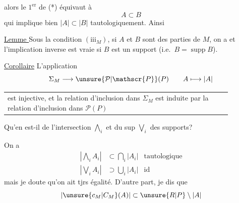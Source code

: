 
alors le $1^{\mathrm{er}}$  de (*)  équivaut à
\[
A\subset B
\]
qui implique bien $|A|\subset|B|$ tautologiquement. Ainsi

\uline{Lemme } Sous la  condition $(\mathrm{iii}_M)$, si $A$ et $B$ sont des parties de $M$, on a
et l'implication inverse est vraie si $B$ est un support (i.e.\ $B=\operatorname{supp}B$).

\uline{Corollaire} L'application
\[
\Sigma_M\longrightarrow\unsure{\mathcal{P}|\mathscr{P}}(P)\qquad A\longmapsto|A|
\]
\begin{tabular}{|p{0.88\linewidth}}
est injective, et la relation d'inclusion dans $\Sigma_M$ est induite par la relation d'inclusion dans $\mathcal{P}(P)$
\end{tabular}

Qu'en est-il de l'intersection $\bigwedge_i$  et du  sup $\bigvee_i$ des supports?

On a
\[
\begin{aligned}
\left|\bigwedge_i A_i\right|&\subset\bigcap_i|A_i|&\text{tautologique}\\
\left|\bigvee_i A_i\right|&\supset\bigcup_i|A_i|&\text{id}
\end{aligned}
\]
mais je doute qu'on ait tjrs égalité. D'autre part, je dis que
\[
|\unsure{c_M|C_M}(A)|\subset\unsure{R|P}\setminus|A|
\]
